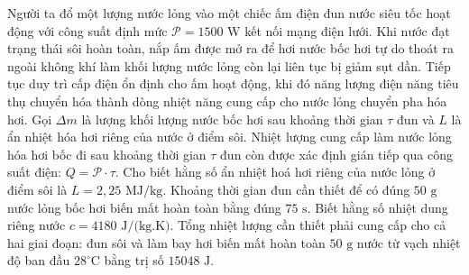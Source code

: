 \begin{ex}%
	Người ta đổ một lượng nước lỏng vào một chiếc ấm điện đun nước siêu tốc hoạt động với công suất định mức $\mathcal{P} = 1500\text{ W}$ kết nối mạng điện lưới. Khi nước đạt trạng thái sôi hoàn toàn, nắp ấm được mở ra để hơi nước bốc hơi tự do thoát ra ngoài không khí làm khối lượng nước lỏng còn lại liên tục bị giảm sụt dần. Tiếp tục duy trì cấp điện ổn định cho ấm hoạt động, khi đó năng lượng điện năng tiêu thụ chuyển hóa thành dòng nhiệt năng cung cấp cho nước lỏng chuyển pha hóa hơi. Gọi $\Delta m$ là lượng khối lượng nước bốc hơi sau khoảng thời gian $\tau$ đun và $L$ là ẩn nhiệt hóa hơi riêng của nước ở điểm sôi.
	{\True Nhiệt lượng cung cấp làm nước lỏng hóa hơi bốc đi sau khoảng thời gian $\tau$ đun còn được xác định gián tiếp qua công suất điện: $Q = \mathcal{P} \cdot \tau$.}
	{\True Cho biết hằng số ẩn nhiệt hoá hơi riêng của nước lỏng ở điểm sôi là $L = 2,25\text{ MJ/kg}$. Khoảng thời gian đun cần thiết để có đúng $50\text{ g}$ nước lỏng bốc hơi biến mất hoàn toàn bằng đúng $75\text{ s}$.}
	{Biết hằng số nhiệt dung riêng nước $c = 4180\text{ J/(kg.K)}$. Tổng nhiệt lượng cần thiết phải cung cấp cho cả hai giai đoạn: đun sôi và làm bay hơi biến mất hoàn toàn $50\text{ g}$ nước từ vạch nhiệt độ ban đầu $28^\circ\text{C}$ bằng trị số $15048\text{ J}$.}
\end{ex}

